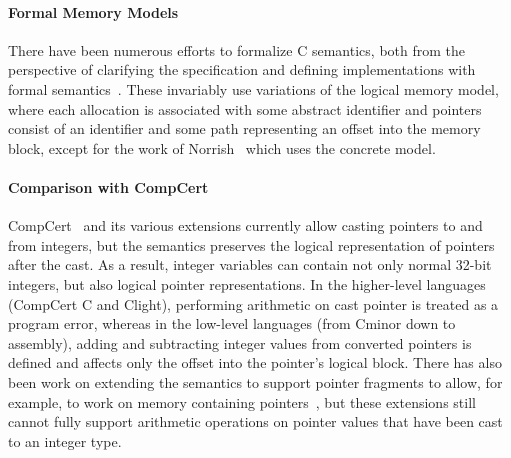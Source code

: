 \paragraph{Formal Memory Models}
There have been numerous efforts to formalize C semantics, both from
the perspective of clarifying the specification and defining
implementations with formal semantics~\cite{norrish1998c,leroy:compcert,ellison2012executable,krebbers2011formalization,Greenaway:2014:DSS:2594291.2594296}. These invariably use
variations of the logical memory model, where each allocation is
associated with some abstract identifier and pointers consist of
an identifier and some path representing an offset into the memory
block, except for the work of Norrish~\cite{norrish1998c} which uses the concrete model.

\paragraph{Comparison with CompCert}
CompCert~\cite{leroy:compcert,Leroy-Appel-Blazy-Stewart-memory-v2} and its various extensions
currently allow casting pointers to and from integers, but the
semantics preserves the logical representation of pointers after the cast. 
As a result, integer variables can contain not only normal 32-bit integers,
but also logical pointer representations.
In the higher-level languages (CompCert C and Clight), performing arithmetic
on cast pointer is treated as a program error, whereas in the low-level languages
(from Cminor down to assembly), adding and subtracting integer values 
from converted pointers is defined and affects only the offset into the pointer's 
logical block. There
has also been work on extending the semantics to support pointer
fragments to allow, for example,  to work on memory
containing pointers~\cite{krebbers2014formal}, but these extensions still cannot fully 
support arithmetic operations on pointer values that have been cast
to an integer type.

